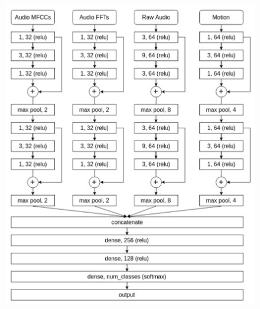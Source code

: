 \documentclass[a4paper,11pt,twoside]{report}
\theoremstyle{definition}
\begin{document}
\begin{figure}[h!]
  \centering
  \begin{minipage}{0.575\linewidth}
      \centering
      \includegraphics[width=\linewidth]{img_related_work/cnn2019.png}
      \label{fig:cnn2019-label}
  \end{minipage}
  \hfill
  \begin{minipage}{0.41\linewidth}
      \centering

\end{minipage}
\end{figure}
\end{document}
